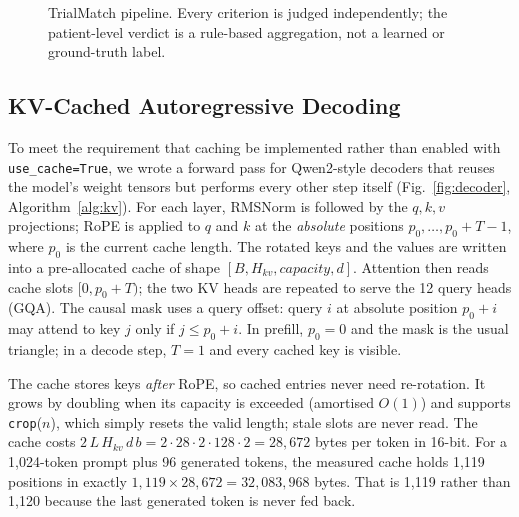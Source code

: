 \documentclass[conference]{IEEEtran}
\begin{document}
\begin{figure}[t]
\caption{TrialMatch pipeline. Every criterion is judged independently; the patient-level verdict is a rule-based aggregation, not a learned or ground-truth label.}
\label{fig:arch}
\end{figure}

\subsection{KV-Cached Autoregressive Decoding}\label{sec:kv}
To meet the requirement that caching be implemented rather than enabled with \texttt{use\_cache=True}, we wrote a forward pass for Qwen2-style decoders that reuses the model's weight tensors but performs every other step itself (Fig.~\ref{fig:decoder}, Algorithm~\ref{alg:kv}). For each layer, RMSNorm is followed by the $q,k,v$ projections; RoPE is applied to $q$ and $k$ at the \emph{absolute} positions $p_0,\ldots,p_0{+}T{-}1$, where $p_0$ is the current cache length. The rotated keys and the values are written into a pre-allocated cache of shape $[B, H_{kv}, \textit{capacity}, d]$. Attention then reads cache slots $[0, p_0{+}T)$; the two KV heads are repeated to serve the 12 query heads (GQA). The causal mask uses a query offset: query $i$ at absolute position $p_0{+}i$ may attend to key $j$ only if $j \le p_0{+}i$. In prefill, $p_0{=}0$ and the mask is the usual triangle; in a decode step, $T{=}1$ and every cached key is visible.

The cache stores keys \emph{after} RoPE, so cached entries never need re-rotation. It grows by doubling when its capacity is exceeded (amortised $O(1)$) and supports \texttt{crop}($n$), which simply resets the valid length; stale slots are never read. The cache costs $2\,L\,H_{kv}\,d\,b = 2\cdot28\cdot2\cdot128\cdot2 = 28{,}672$ bytes per token in 16-bit. For a 1{,}024-token prompt plus 96 generated tokens, the measured cache holds 1{,}119 positions in exactly $1{,}119\times28{,}672 = 32{,}083{,}968$ bytes. That is 1{,}119 rather than 1{,}120 because the last generated token is never fed back.
\end{document}
